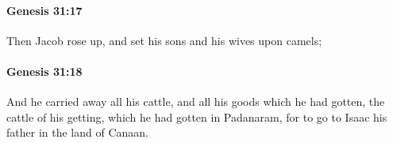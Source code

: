 		\paragraph{Genesis 31:17} %
			\label{GENESIS-31-17}

			Then Jacob rose up, and set his sons and his wives upon camels;


		\paragraph{Genesis 31:18} %
			\label{GENESIS-31-18}

			And he carried away all his cattle, and all his goods which he had gotten, the cattle of his getting, which he had gotten in Padanaram, for to go to Isaac his father in the land of Canaan.


